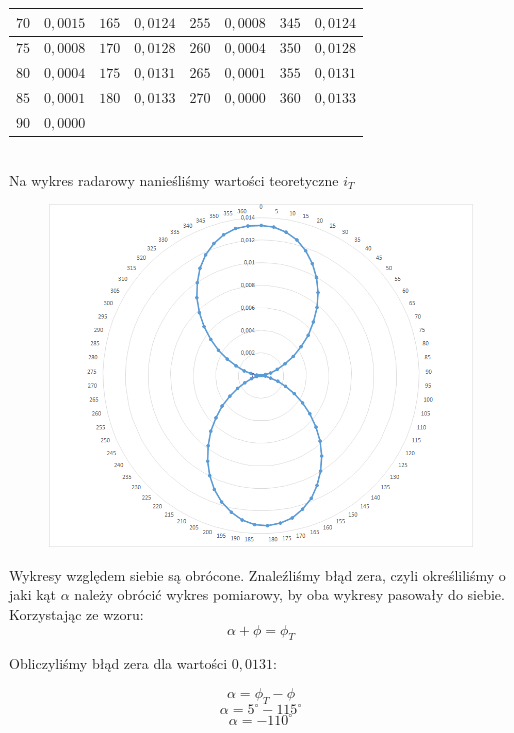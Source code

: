 \documentclass{article}
\begin{document}
\begin{center}
\begin{tabular}{|c|c|c|c|c|c|c|c|}
    $70$ & $0,0015$ & $165$ & $0,0124$ & $255$ & $0,0008$ & $345$ & $0,0124$\\ \hline
    $75$ & $0,0008$ & $170$ & $0,0128$ & $260$ & $0,0004$ & $350$ & $0,0128$\\ \hline
    $80$ & $0,0004$ & $175$ & $0,0131$ & $265$ & $0,0001$ & $355$ & $0,0131$\\ \hline
    $85$ & $0,0001$ & $180$ & $0,0133$ & $270$ & $0,0000$ & $360$ & $0,0133$\\ \hline
    $90$ & $0,0000$ &       &          &       &          &       &         \\ \hline
    \end{tabular}
\end{center}

$$$$\\
Na wykres radarowy nanieśliśmy wartości teoretyczne $i_T$\newpage

\begin{figure}
\centering
\includegraphics[width=18cm]{wykres1.png}
\end{figure}

Wykresy względem siebie są obrócone. Znaleźliśmy błąd zera, czyli określiliśmy o jaki kąt $\alpha$ należy obrócić wykres pomiarowy, by oba wykresy pasowały do siebie. Korzystając ze wzoru:
$$\alpha + \phi = \phi_T$$

Obliczyliśmy błąd zera dla wartości $0,0131$:

$$\alpha = \phi_T - \phi$$
$$\alpha = 5^{\circ} - 115^{\circ}$$
$$\alpha = -110^{\circ}$$
\end{document}
